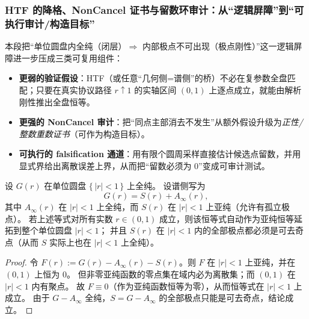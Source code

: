 \subsubsection{HTF 的降格、NonCancel 证书与留数环审计：从“逻辑屏障”到“可执行审计/构造目标”}\label{subsec:htf-downgrade-audit-constructive}
本段把“单位圆盘内全纯（闭层）$\Rightarrow$ 内部极点不可出现（极点刚性）”这一逻辑屏障进一步压成三类可复用组件：
\begin{itemize}
  \item \textbf{更弱的验证假设}：HTF（或任意“几何侧=谱侧”的桥）不必在复参数全盘匹配；只要在真实协议路径 \(r\uparrow 1\) 的实轴区间 \((0,1)\) 上逐点成立，就能由解析刚性推出全盘恒等。
  \item \textbf{更强的 NonCancel 审计}：把“同点主部消去不发生”从额外假设升级为\emph{正性/整数重数证书}（可作为构造目标）。
  \item \textbf{可执行的 falsification 通道}：用有限个圆周采样直接估计候选点留数，并用显式界给出离散误差上界，从而把“留数必须为 \(0\)”变成可审计测试。
\end{itemize}

\begin{proposition}\label{prop:real-arc-sufficiency-unit-disk}
设 \(G(r)\) 在单位圆盘 \(\{\,|r|<1\,\}\) 上全纯。
设谱侧写为
\[
G(r)=S(r)+A_\infty(r),
\]
其中 \(A_\infty(r)\) 在 \(|r|<1\) 上全纯，而 \(S(r)\) 在 \(|r|<1\) 上亚纯（允许有孤立极点）。
若上述等式对所有实数 \(r\in(0,1)\) 成立，则该恒等式自动作为亚纯恒等延拓到整个单位圆盘 \(|r|<1\)；
并且 \(S(r)\) 在 \(|r|<1\) 内的全部极点都必须是可去奇点（从而 \(S\) 实际上也在 \(|r|<1\) 上全纯）。
\end{proposition}
\begin{proof}
令 \(F(r):=G(r)-A_\infty(r)-S(r)\)。则 \(F\) 在 \(|r|<1\) 上亚纯，并在 \((0,1)\) 上恒为 \(0\)。
但非零亚纯函数的零点集在域内必为离散集；而 \((0,1)\) 在 \(|r|<1\) 内有聚点。
故 \(F\equiv 0\)（作为亚纯函数恒等为零），从而恒等式在 \(|r|<1\) 上成立。
由于 \(G-A_\infty\) 全纯，\(S=G-A_\infty\) 的全部极点只能是可去奇点，结论成立。
\end{proof}

